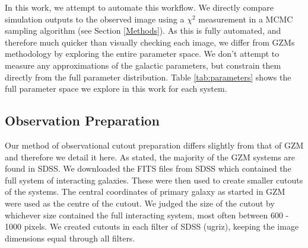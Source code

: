 \begin{table}
    \centering
    \caption{The thirteen parameters used in both JSPAM and APySPAM to recreate an interaction. Each of these parameters must be found to consider an interaction constrained. The Parameter column shows how each parameter will be described throughout the rest of this paper. The third column then gives the conversion required to go from simulation units to SI units.  }
    \label{tab:parameters}
\end{table}

In this work, we attempt to automate this workflow. We directly compare simulation outputs to the observed image using a $\chi^{2}$ measurement in a MCMC sampling algorithm (see Section \ref{Methods}). As this is fully automated, and therefore much quicker than visually checking each image, we differ from GZMs methodology by exploring the entire parameter space. We don't attempt to measure any approximations of the galactic parameters, but constrain them directly from the full parameter distribution. Table \ref{tab:parameters} shows the full parameter space we explore in this work for each system.

\subsection{Observation Preparation}
\noindent Our method of observational cutout preparation differs slightly from that of GZM and therefore we detail it here. As stated, the majority of the GZM systems are found in SDSS. We downloaded the FITS files from SDSS which contained the full system of interacting galaxies. These were then used to create smaller cutouts of the systems. The central coordinates of primary galaxy as started in GZM were used as the centre of the cutout. We judged the size of the cutout by whichever size contained the full interacting system, most often between 600 - 1000 pixels. We created cutouts in each filter of SDSS (ugriz), keeping the image dimensions equal through all filters. 

